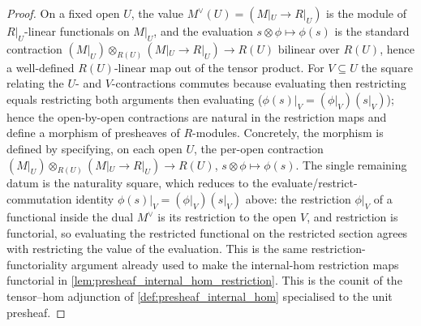 \begin{proof}
  \leanok
  On a fixed open \(U\), the value \(M^\vee(U) = (M|_U \to R|_U)\) is the module of
  \(R|_U\)-linear functionals on \(M|_U\), and the evaluation
  \(s \otimes \phi \mapsto \phi(s)\) is the standard contraction
  \((M|_U) \otimes_{R(U)} (M|_U \to R|_U) \to R(U)\) bilinear over \(R(U)\), hence a
  well-defined \(R(U)\)-linear map out of the tensor product. For \(V \subseteq U\)
  the square relating the \(U\)- and \(V\)-contractions commutes because evaluating
  then restricting equals restricting both arguments then evaluating
  (\(\phi(s)|_V = (\phi|_V)(s|_V)\)); hence the open-by-open contractions are natural
  in the restriction maps and define a morphism of presheaves of \(R\)-modules.
  Concretely, the morphism is defined by specifying, on each open \(U\), the per-open
  contraction \((M|_U) \otimes_{R(U)} (M|_U \to R|_U) \to R(U)\), \(s \otimes \phi \mapsto \phi(s)\).
  The single remaining datum is the naturality square, which reduces to the
  evaluate/restrict-commutation identity \(\phi(s)|_V = (\phi|_V)(s|_V)\) above: the
  restriction \(\phi|_V\) of a functional inside the dual \(M^\vee\) is its restriction
  to the open \(V\), and restriction is functorial, so evaluating the restricted
  functional on the restricted section agrees with restricting the value of the
  evaluation. This is the same restriction-functoriality argument already used to make
  the internal-hom restriction maps functorial in
  \cref{lem:presheaf_internal_hom_restriction}. This is the counit of the tensor--hom
  adjunction of \cref{def:presheaf_internal_hom} specialised to the unit presheaf.
\end{proof}

